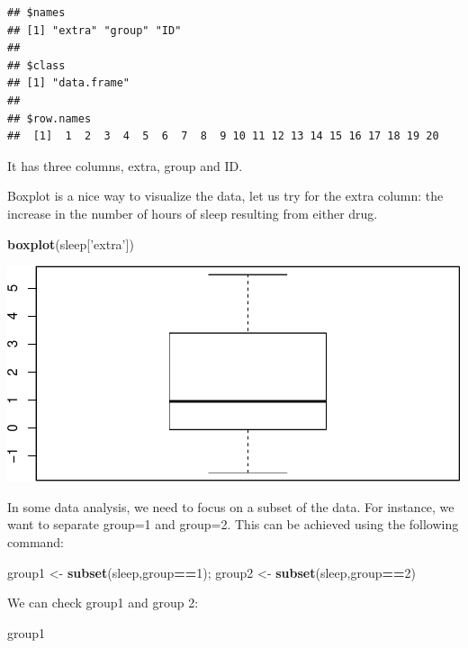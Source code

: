\documentclass[]{article}
\newenvironment{Shaded}{\begin{snugshade}}{\end{snugshade}}
\newcommand{\DecValTok}[1]{\textcolor[rgb]{0.00,0.00,0.81}{#1}}
\newcommand{\KeywordTok}[1]{\textcolor[rgb]{0.13,0.29,0.53}{\textbf{#1}}}
\newcommand{\NormalTok}[1]{#1}
\newcommand{\OperatorTok}[1]{\textcolor[rgb]{0.81,0.36,0.00}{\textbf{#1}}}
\newcommand{\StringTok}[1]{\textcolor[rgb]{0.31,0.60,0.02}{#1}}
\begin{document}
\begin{verbatim}
## $names
## [1] "extra" "group" "ID"   
## 
## $class
## [1] "data.frame"
## 
## $row.names
##  [1]  1  2  3  4  5  6  7  8  9 10 11 12 13 14 15 16 17 18 19 20
\end{verbatim}

It has three columns, extra, group and ID.

Boxplot is a nice way to visualize the data, let us try for the extra
column: the increase in the number of hours of sleep resulting from
either drug.

\begin{Shaded}
\begin{Highlighting}[]
\KeywordTok{boxplot}\NormalTok{(sleep[}\StringTok{'extra'}\NormalTok{])}
\end{Highlighting}
\end{Shaded}

\includegraphics{RMarkdown-Example_files/figure-latex/unnamed-chunk-8-1.pdf}

In some data analysis, we need to focus on a subset of the data. For
instance, we want to separate group=1 and group=2. This can be achieved
using the following command:

\begin{Shaded}
\begin{Highlighting}[]
\NormalTok{group1 <-}\StringTok{ }\KeywordTok{subset}\NormalTok{(sleep,group}\OperatorTok{==}\DecValTok{1}\NormalTok{);}
\NormalTok{group2 <-}\StringTok{ }\KeywordTok{subset}\NormalTok{(sleep,group}\OperatorTok{==}\DecValTok{2}\NormalTok{)}
\end{Highlighting}
\end{Shaded}

We can check group1 and group 2:

\begin{Shaded}
\begin{Highlighting}[]
\NormalTok{group1}
\end{Highlighting}
\end{Shaded}
\end{document}
